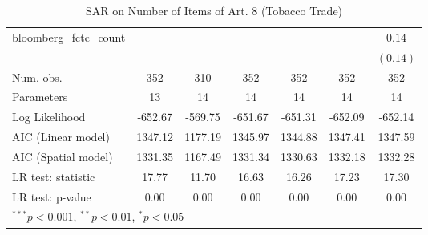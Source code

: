 \begin{table}[!h]
\begin{center}
\begin{tabular}{l c c c c c c }
bloomberg\_fctc\_count  &              &              &              &              &              & $0.14$       \\
                        &              &              &              &              &              & $(0.14)$     \\
\midrule
Num. obs.               & 352          & 310          & 352          & 352          & 352          & 352          \\
Parameters              & 13           & 14           & 14           & 14           & 14           & 14           \\
Log Likelihood          & -652.67      & -569.75      & -651.67      & -651.31      & -652.09      & -652.14      \\
AIC (Linear model)      & 1347.12      & 1177.19      & 1345.97      & 1344.88      & 1347.41      & 1347.59      \\
AIC (Spatial model)     & 1331.35      & 1167.49      & 1331.34      & 1330.63      & 1332.18      & 1332.28      \\
LR test: statistic      & 17.77        & 11.70        & 16.63        & 16.26        & 17.23        & 17.30        \\
LR test: p-value        & 0.00         & 0.00         & 0.00         & 0.00         & 0.00         & 0.00         \\
\bottomrule
\multicolumn{7}{l}{\scriptsize{$^{***}p<0.001$, $^{**}p<0.01$, $^*p<0.05$}}
\end{tabular}
\caption{SAR on Number of Items of Art. 8 (Tobacco Trade)}
\label{table:coefficients}
\end{center}
\end{table}
